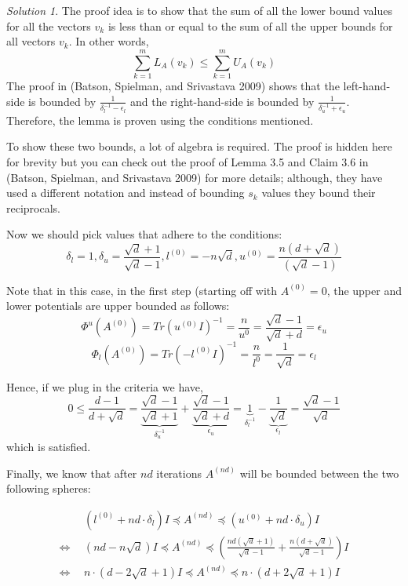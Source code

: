 \documentclass[
  letterpaper,
  DIV=11,
  numbers=noendperiod]{scrartcl}
\theoremstyle{plain}
\theoremstyle{plain}
\theoremstyle{plain}
\theoremstyle{definition}
\theoremstyle{remark}
\newtheorem*{solution}{Solution}
\begin{document}
\begin{solution}

The proof idea is to show that the sum of all the lower bound values for
all the vectors \(v_k\) is less than or equal to the sum of all the
upper bounds for all vectors \(v_k\). In other words,
\[\sum_{k=1}^m L_A(v_k) \le \sum_{k=1}^m U_A(v_k)\] The proof in
(Batson, Spielman, and Srivastava 2009) shows that the left-hand-side is
bounded by \(\frac{1}{\delta_l^{-1} - \epsilon_l}\) and the
right-hand-side is bounded by \(\frac{1}{\delta_u^{-1} + \epsilon_u}\).
Therefore, the lemma is proven using the conditions mentioned.

To show these two bounds, a lot of algebra is required. The proof is
hidden here for brevity but you can check out the proof of Lemma 3.5 and
Claim 3.6 in (Batson, Spielman, and Srivastava 2009) for more details;
although, they have used a different notation and instead of bounding
\(s_k\) values they bound their reciprocals.

\end{solution}

Now we should pick values that adhere to the conditions:
\[\delta_l = 1, \delta_u = \frac{\sqrt{d} + 1}{ \sqrt{d} - 1}, l^{(0)} = -n \sqrt{d}, u^{(0)} = \frac{n(d+\sqrt{d})}{(\sqrt{d} -1)}\]

Note that in this case, in the first step (starting off with
\(A^{(0)} = 0\), the upper and lower potentials are upper bounded as
follows:
\[\Phi^u(A^{(0)}) = Tr(u^{(0)}I)^{-1} = \frac{n}{u^{0}} = \frac{\sqrt{d} - 1}{\sqrt{d} + d} = \epsilon_u\]
\[\Phi_l(A^{(0)}) = Tr(-l^{(0)} I)^{-1} = \frac{n}{l^{0}} = \frac{1}{\sqrt{d}} = \epsilon_l\]

Hence, if we plug in the criteria we have, \[
0 \le 
\frac{d-1}{d + \sqrt{d}} = \underset{\delta_u^{-1}}{\underbrace{\frac{\sqrt{d} - 1}{\sqrt{d} + 1}}} + \underset{\epsilon_u}{\underbrace{\frac{\sqrt{d}-1}{\sqrt{d}+d}}} = \underset{\delta_l^{-1}}{\underbrace{1}} - \underset{\epsilon_l}{\underbrace{\frac{1}{\sqrt{d}}}} = \frac{\sqrt{d} - 1}{\sqrt{d}}
\] which is satisfied.

Finally, we know that after \(nd\) iterations \(A^{(nd)}\) will be
bounded between the two following spheres:

\begin{align*}
&~~(l^{(0)} + nd \cdot \delta_l) I \preceq A^{(nd)} \preceq (u^{(0)} + nd \cdot \delta_u) I\\
\Leftrightarrow & ~~ (nd - n \sqrt{d}) I \preceq A^{(nd)} \preceq \left(\frac{nd (\sqrt{d} + 1)}{\sqrt{d} - 1} + \frac{n(d + \sqrt{d})}{\sqrt{d} - 1}\right) I\\
\Leftrightarrow & ~~ n \cdot (d - 2 \sqrt{d} + 1) I \preceq A^{(nd)} \preceq n \cdot (d + 2 \sqrt{d} + 1) I\\
\end{align*}
\end{document}
